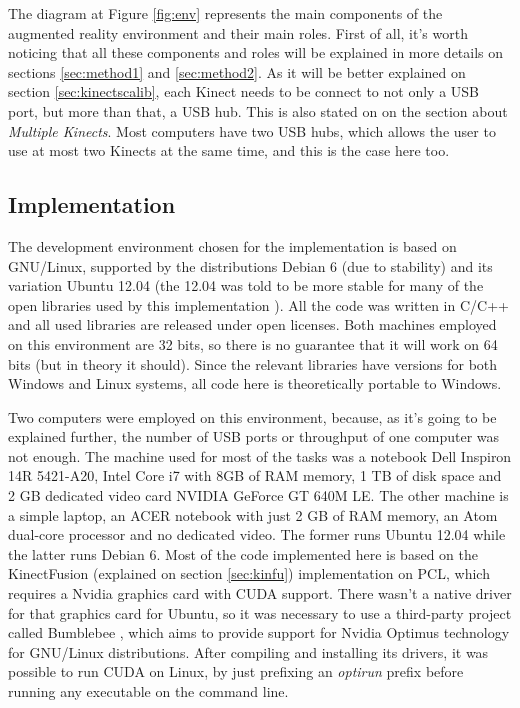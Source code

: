 \documentclass[msc, a4paper, classic, en]{ufbathesis}
\begin{document}
The diagram at Figure \ref{fig:env} represents the main components of the augmented reality environment and their main roles. First of all, it's worth noticing that all these components and roles will be explained in more details on sections \ref{sec:method1} and \ref{sec:method2}. As it will be better explained on section \ref{sec:kinectscalib}, each Kinect needs to be connect to not only a USB port, but more than that, a USB hub. This is also stated on \cite{kinecthacks} on the section about \textit{Multiple Kinects}. Most computers have two USB hubs, which allows the user to use at most two Kinects at the same time, and this is the case here too.

\subsection{Implementation}

The development environment chosen for the implementation is based on GNU/Linux, supported by the distributions Debian 6 (due to stability) and its variation Ubuntu 12.04 (the 12.04 was told to be more stable for many of the open libraries used by this implementation \cite{pcl14}). All the code was written in C/C++ and all used libraries are released under open licenses. Both machines employed on this environment are 32 bits, so there is no guarantee that it will work on 64 bits (but in theory it should). Since the relevant libraries have versions for both Windows and Linux systems, all code here is theoretically portable to Windows.

Two computers were employed on this environment, because, as it's going to be explained further, the number of USB ports or throughput of one computer was not enough. The machine used for most of the tasks was a notebook Dell Inspiron 14R 5421-A20, Intel Core i7 with 8GB of RAM memory, 1 TB of disk space and 2 GB dedicated video card NVIDIA GeForce GT 640M LE. The other machine is a simple laptop, an ACER notebook with just 2 GB of RAM memory, an Atom dual-core processor and no dedicated video. The former runs Ubuntu 12.04 while the latter runs Debian 6. Most of the code implemented here is based on the KinectFusion (explained on section \ref{sec:kinfu}) implementation on PCL, which requires a Nvidia graphics card with CUDA support. There wasn't a native driver for that graphics card for Ubuntu, so it was necessary to use a third-party project called Bumblebee \cite{bumblebee}, which aims to provide support for Nvidia Optimus technology for GNU/Linux distributions. After compiling and installing its drivers, it was possible to run CUDA on Linux, by just prefixing an \textit{optirun} prefix before running any executable on the command line.
\end{document}

